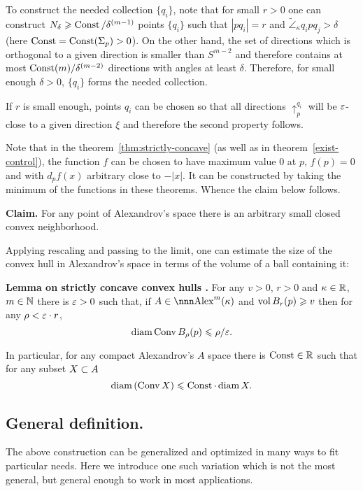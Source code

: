 \documentclass{article}
\begin{document}
To construct the needed collection $\{q_i\}$, note that for small $r>0$ one can
construct $N_\delta\geqslant \operatorname{Const}/\delta^{(m-1)}$ points $\{q_i\}$ such that $|p q_i|=r$
and $\tilde\angle_\kappa q_i p q_j>\delta$ (here $\operatorname{Const}=\operatorname{Const}(\Sigma_p)>0$).
On the other hand, the set of directions which is orthogonal to a given direction
is smaller than $S^{m-2}$ and therefore contains at most
$\operatorname{Const}(m)/\delta^{(m-2)}$ directions with angles at least $\delta$. 
Therefore, for small enough $\delta>0$, $\{q_i\}$ forms the needed collection.

If $r$ is small enough, points $q_i$ can be chosen so that all directions
$\uparrow_p^{q_i}$ will be $\varepsilon$-close to a given direction $\xi$ and
therefore the second property follows.
\qeds

Note that in the theorem~\ref{thm:strictly-concave} (as well as in
theorem~\ref{exist-control}), the function $f$ can be chosen to have maximum value $0$ at $p$,
$f(p)=0$ and with $d_p f(x)$ arbitrary close to $-|x|$.
It can be constructed by taking the minimum of the functions in these theorems. Whence the claim below follows.


\begin{thm}{\bf Claim.}\label{cor:convex-nbhd}
For any point of Alexandrov's space there is an arbitrary small closed convex
neighborhood.
\end{thm}

Applying rescaling and passing to the limit, 
one can estimate the size of the convex
hull in Alexandrov's space in terms of the volume of a ball containing it:

\begin{thm}{\bf Lemma on strictly concave convex hulls
\cite[4.3]{perelman-petrunin:extremal}.}
For any $v>0$, $r>0$ and $\kappa\in \mathbb{R}$, $m\in\mathbb{N}$ there is $\varepsilon>0$ such that,
if $A\in\Alex^m(\kappa)$ and $\operatorname{vol} B_{r}(p)\geqslant v$ then for any $\rho<\varepsilon\cdot r$, 
$$\operatorname{diam}\operatorname{Conv} B_\rho(p)\leqslant \rho/\varepsilon.$$

In particular, for any compact Alexandrov's $A$ space there is $\operatorname{Const}\in \mathbb{R}$ such that for
any subset $X\subset A$
$$\operatorname{diam} \left(\operatorname{Conv} X \right)\leqslant \operatorname{Const}\cdot\operatorname{diam} X.$$
\end{thm}





\subsection{General definition.} 
The above construction can be generalized and optimized in many ways to fit
particular needs. 
Here we introduce one such variation which is not the most general, but general
enough to work in most applications.
\end{document}
